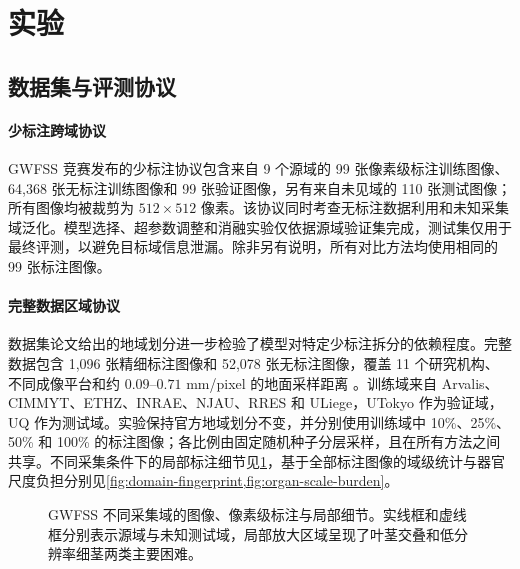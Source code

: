 \section{实验}
\label{sec:experiments}

\subsection{数据集与评测协议}
\label{sec:datasets}

\paragraph{少标注跨域协议}
GWFSS 竞赛发布的少标注协议包含来自 9 个源域的 99 张像素级标注训练图像、64,368 张无标注训练图像和 99 张验证图像，另有来自未见域的 110 张测试图像；所有图像均被裁剪为 $512\times512$ 像素。该协议同时考查无标注数据利用和未知采集域泛化。模型选择、超参数调整和消融实验仅依据源域验证集完成，测试集仅用于最终评测，以避免目标域信息泄漏。除非另有说明，所有对比方法均使用相同的 99 张标注图像。

\paragraph{完整数据区域协议}
数据集论文给出的地域划分进一步检验了模型对特定少标注拆分的依赖程度。完整数据包含 1,096 张精细标注图像和 52,078 张无标注图像，覆盖 11 个研究机构、不同成像平台和约 $0.09$--$0.71$ mm/pixel 的地面采样距离 \citep{wang2025gwfss}。训练域来自 Arvalis、CIMMYT、ETHZ、INRAE、NJAU、RRES 和 ULiege，UTokyo 作为验证域，UQ 作为测试域。实验保持官方地域划分不变，并分别使用训练域中 10\%、25\%、50\% 和 100\% 的标注图像；各比例由固定随机种子分层采样，且在所有方法之间共享。不同采集条件下的局部标注细节见\cref{fig:dataset}，基于全部标注图像的域级统计与器官尺度负担分别见\cref{fig:domain-fingerprint,fig:organ-scale-burden}。

\begin{figure}[!htbp]
\centering
\caption{GWFSS 不同采集域的图像、像素级标注与局部细节。实线框和虚线框分别表示源域与未知测试域，局部放大区域呈现了叶茎交叠和低分辨率细茎两类主要困难。}
\label{fig:dataset}
\end{figure}

